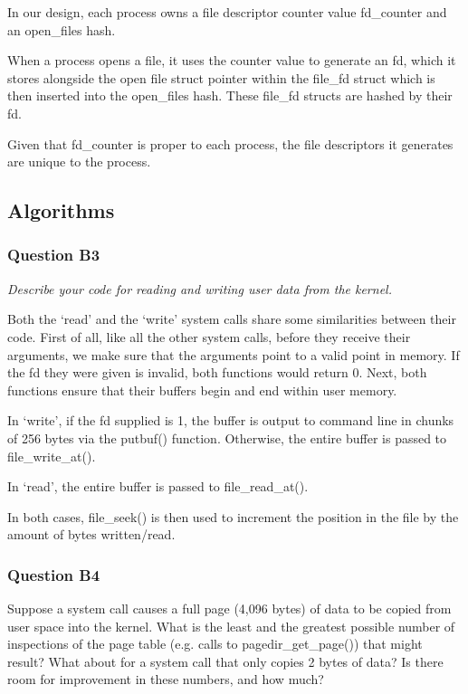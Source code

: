 In our design, each process owns a file descriptor counter value fd\_counter and an open\_files hash.

When a process opens a file, it uses the counter value to generate an fd, which it stores alongside the open file struct pointer within the file\_fd struct which is then inserted into the open\_files hash. These file\_fd structs are hashed by their fd.

Given that fd\_counter is proper to each process, the file descriptors it generates are unique to the process.

\subsection{Algorithms}
\subsubsection*{Question B3} %
\textit{Describe your code for reading and writing user data from the kernel.}

Both the `read' and the `write' system calls share some similarities between their code.
First of all, like all the other system calls, before they receive their arguments, we make sure that the arguments point to a valid point in memory.
If the fd they were given is invalid, both functions would return 0.
Next, both functions ensure that their buffers begin and end within user memory.

In `write', if the fd supplied is 1, the buffer is output to command line in chunks of 256 bytes via the putbuf() function. Otherwise, the entire buffer is passed to file\_write\_at(). 

In `read', the entire buffer is passed to file\_read\_at().

In both cases, file\_seek() is then used to increment the position in the file by the amount of bytes written/read.

\subsubsection*{Question B4} %
Suppose a system call causes a full page (4,096 bytes) of data to be copied from user space into the kernel.  What is the least and the greatest possible number of inspections of the page table (e.g. calls to pagedir\_get\_page()) that might result?  What about for a system call that only copies 2 bytes of data?  Is there room for improvement in these numbers, and how much?

